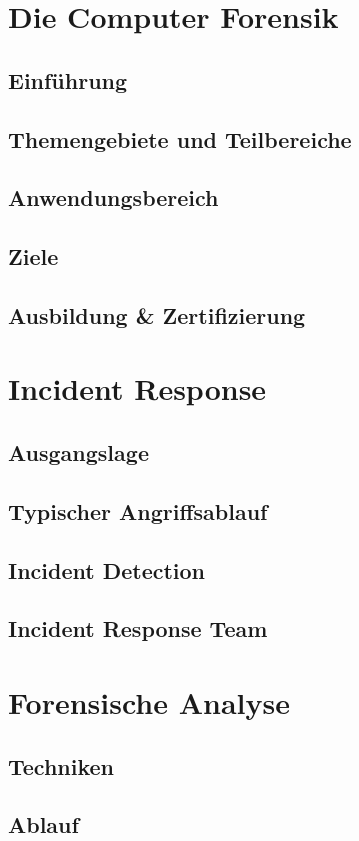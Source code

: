 \chapter{Die Computer Forensik}
\section{Einführung}

\section{Themengebiete und Teilbereiche}

\section{Anwendungsbereich}

\section{Ziele}

\section{Ausbildung \& Zertifizierung}

\chapter{Incident Response}
\section{Ausgangslage}

\section{Typischer Angriffsablauf}

\section{Incident Detection}
\section{Incident Response Team}

\chapter{Forensische Analyse}
\section{Techniken}


\section{Ablauf}
